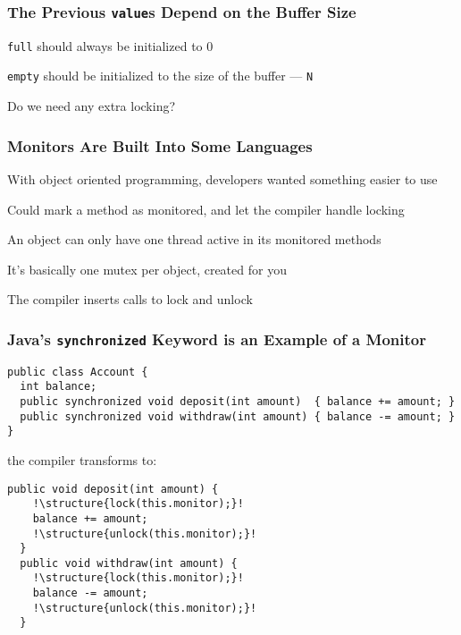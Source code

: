  \begin{frame}
    \frametitle{The Previous \texttt{value}s Depend on the Buffer Size}

    \texttt{full} should always be initialized to 0

    \vspace{2em}

    \texttt{empty} should be initialized to the size of the buffer ---
    \texttt{N}

    \vspace{2em}

    Do we need any extra locking?

  \end{frame}

  \begin{frame}
    \frametitle{Monitors Are Built Into Some Languages}

    With object oriented programming, developers wanted something easier to use

    \vspace{2em}

    Could mark a method as monitored, and let the compiler handle locking

    \hspace{2em} An object can only have one thread active in its monitored
    methods

    \vspace{2em}

    It's basically one mutex per object, created for you

    \hspace{2em} The compiler inserts calls to lock and unlock
  \end{frame}

  \begin{frame}[fragile]
    \frametitle{Java's \texttt{synchronized} Keyword is an Example of a Monitor}

    \begin{lstlisting}
public class Account {
  int balance;
  public synchronized void deposit(int amount)  { balance += amount; }
  public synchronized void withdraw(int amount) { balance -= amount; }
}
    \end{lstlisting}

    the compiler transforms to:

    \begin{lstlisting}[escapechar=!]
  public void deposit(int amount) {
    !\structure{lock(this.monitor);}!
    balance += amount;
    !\structure{unlock(this.monitor);}!
  }
  public void withdraw(int amount) {
    !\structure{lock(this.monitor);}!
    balance -= amount;
    !\structure{unlock(this.monitor);}!
  }
    \end{lstlisting}
  \end{frame}

